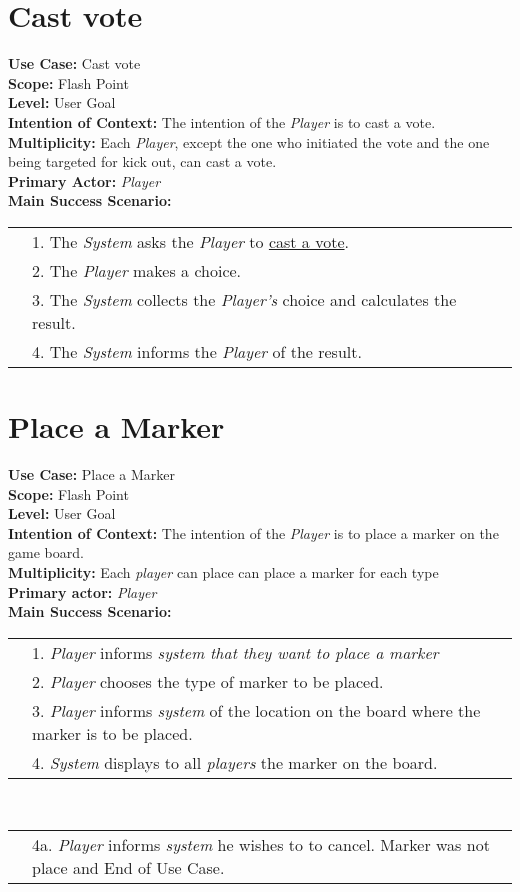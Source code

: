\documentclass{article}
\begin{document}
	\section*{Cast vote}
	\textbf{Use Case:} Cast vote\\
	\textbf{Scope:} Flash Point\\
	\textbf{Level:} User Goal\\
	\textbf{Intention of Context:} The intention of the \textit{Player} is to cast a vote.\\
	\textbf{Multiplicity: }Each \textit{Player}, except the one who initiated the vote and the one being targeted for kick out, can cast a vote.\\
	\textbf{Primary Actor:} \textit{Player}\\
	\textbf{Main Success Scenario:}\\
	\begin{tabular}{l l}
		&1. The \textit{System} asks the \textit{Player} to \underline{cast a vote}.\\
		&2. The \textit{Player} makes a choice.\\
		&3. The \textit{System} collects the \textit{Player's} choice and calculates the result.\\
		&4. The \textit{System} informs the \textit{Player} of the result.
	\end{tabular}
	\section*{Place a Marker}
	\textbf{Use Case:} Place a Marker\\
	\textbf{Scope:} Flash Point\\
	\textbf{Level:} User Goal\\
	\textbf{Intention of Context:} The intention of the \textit{Player} is to place a marker on the game board.\\
	\textbf{Multiplicity: }Each \textit{player} can place can place a marker for each type\\
	\textbf{Primary actor:} \textit{Player}\\
	\textbf{Main Success Scenario:}\\
	\begin{tabular}{l l}
		&1. \textit{Player} informs \textit{system that they want to place a marker}\\
		&2. \textit{Player} chooses the type of marker to be placed.\\
		&3. \textit{Player} informs \textit{system} of the location on the board where the marker is to be placed.\\
		&4. \textit{System} displays to all \textit{players} the marker on the board.
	\end{tabular}\\
	\begin{tabular}{l l}
		
		&4a. \textit{Player} informs \textit{system} he wishes to to cancel. Marker was not place and End of Use Case.
	\end{tabular}
\end{document}
